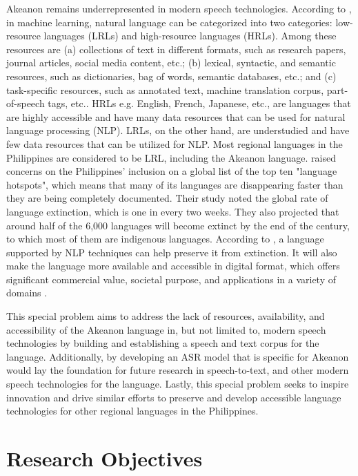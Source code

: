 Akeanon remains underrepresented in modern speech technologies. According to , in machine learning, natural language can be categorized into two categories: low-resource languages (LRLs) and high-resource languages (HRLs). Among these resources are (a) collections of text in different formats, such as research papers, journal articles, social media content, etc.; (b) lexical, syntactic, and semantic resources, such as dictionaries, bag of words, semantic databases, etc.; and (c) task-specific resources, such as annotated text, machine translation corpus, part-of-speech tags, etc.. HRLs e.g. English, French, Japanese, etc., are languages that are highly accessible and have many data resources that can be used for natural language processing (NLP). LRLs, on the other hand, are understudied and have few data resources that can be utilized for NLP.  Most regional languages in the Philippines are considered to be LRL, including the Akeanon language.  raised concerns on the Philippines' inclusion on a global list of the top ten "language hotspots", which means that many of its languages are disappearing faster than they are being completely documented. Their study noted the global rate of language extinction, which is one in every two weeks. They also projected that around half of the 6,000 languages will become extinct by the end of the century, to which most of them are indigenous languages. According to , a language supported by NLP techniques can help preserve it from extinction. It will also make the language more available and accessible in digital format, which offers significant commercial value, societal purpose, and applications in a variety of domains \cite{Tsvetkov:2017}.

This special problem aims to address the lack of resources, availability, and accessibility of the Akeanon language in, but not limited to, modern speech technologies by building and establishing a speech and text corpus for the language. Additionally, by developing an ASR model that is specific for Akeanon would lay the foundation for future research in speech-to-text, and other modern speech technologies for the language. Lastly, this special problem seeks to inspire innovation and drive similar efforts to preserve and develop accessible language technologies for other regional languages in the Philippines.

\section{Research Objectives}
\label{sec:researchobjectives}

